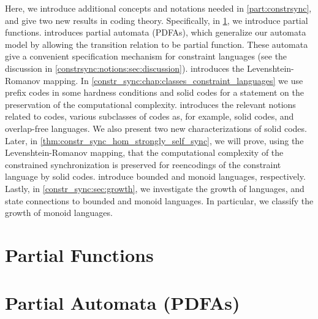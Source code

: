 
Here, we introduce additional concepts and notations %
needed in \cref{part:constrsync}, and give two new results in coding theory.
Specifically, in \cref{constr_sync:subsec:pfun}, we introduce partial functions. 
 introduces
partial automata (PDFAs), which generalize our automata model by allowing
the transition relation to be partial function.
These automata give a convenient specification mechanism
for constraint languages (see the discussion in \cref{constrsync:notions:sec:discussion}).
 introduces
the Levenshtein-Romanov mapping.
In \cref{constr_sync:chap:classes_constraint_languages} we use prefix codes in some hardness conditions
and solid codes for a statement on the preservation of the computational complexity.
 introduces the relevant notions
related to codes, various subclasses of codes as, for example, solid codes,
and overlap-free languages. We also present two new characterizations of solid codes.
Later, in \cref{thm:constr_sync_hom_strongly_self_sync}, 
we will prove, using the Levenshtein-Romanov mapping, 
that the computational complexity
of the constrained synchronization is preserved for reencodings
of the constraint language by solid codes.
 introduce bounded and monoid languages, respectively.
Lastly, in \cref{constr_sync:sec:growth}, we investigate
the growth of languages, and state connections to bounded and monoid languages.
In particular, we classify the growth of monoid languages.

\section{Partial Functions}
\label{constr_sync:subsec:pfun}



\section{Partial Automata (PDFAs)}
\label{constr_sync:subsec:pdfa}

